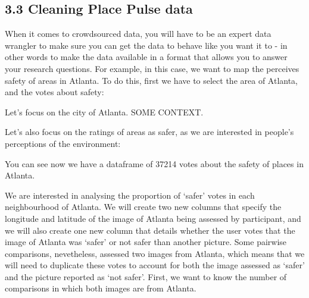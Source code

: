 \documentclass[
]{article}
\newenvironment{Shaded}{\begin{snugshade}}{\end{snugshade}}
\newcommand{\KeywordTok}[1]{\textcolor[rgb]{0.13,0.29,0.53}{\textbf{#1}}}
\newcommand{\NormalTok}[1]{#1}
\newcommand{\OperatorTok}[1]{\textcolor[rgb]{0.81,0.36,0.00}{\textbf{#1}}}
\newcommand{\StringTok}[1]{\textcolor[rgb]{0.31,0.60,0.02}{#1}}
\begin{document}
\hypertarget{cleaning-place-pulse-data}{%
\subsection{3.3 Cleaning Place Pulse
data}\label{cleaning-place-pulse-data}}

When it comes to crowdsourced data, you will have to be an expert data
wrangler to make sure you can get the data to behave like you want it to
- in other words to make the data available in a format that allows you
to answer your research questions. For example, in this case, we want to
map the perceives safety of areas in Atlanta. To do this, first we have
to select the area of Atlanta, and the votes about safety:

Let's focus on the city of Atlanta. SOME CONTEXT.

\begin{Shaded}
\end{Shaded}

Let's also focus on the ratings of areas as safer, as we are interested
in people's perceptions of the environment:

\begin{Shaded}
\end{Shaded}

You can see now we have a dataframe of 37214 votes about the safety of
places in Atlanta.

We are interested in analysing the proportion of `safer' votes in each
neighbourhood of Atlanta. We will create two new columns that specify
the longitude and latitude of the image of Atlanta being assessed by
participant, and we will also create one new column that details whether
the user votes that the image of Atlanta was `safer' or not safer than
another picture. Some pairwise comparisons, nevetheless, assessed two
images from Atlanta, which means that we will need to duplicate these
votes to account for both the image assessed as `safer' and the picture
reported as `not safer'. First, we want to know the number of
comparisons in which both images are from Atlanta.
\end{document}
